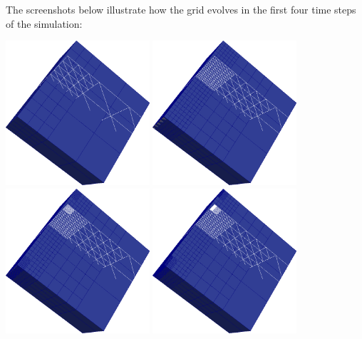 \noindent
The screenshots below illustrate how the grid evolves in the first four time
steps of the simulation:
\begin{center}
  \includegraphics[width=0.4\textwidth]{41_heat-equation/dynamic00.png}
  \includegraphics[width=0.4\textwidth]{41_heat-equation/dynamic01.png}
  \includegraphics[width=0.4\textwidth]{41_heat-equation/dynamic02.png}
  \includegraphics[width=0.4\textwidth]{41_heat-equation/dynamic03.png}
\end{center}